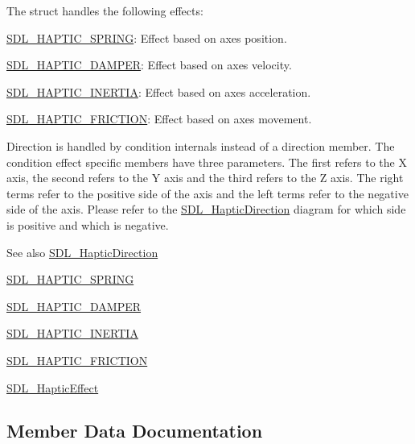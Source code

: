 The struct handles the following effects\+:
\begin{DoxyItemize}
\item \hyperlink{SDL__haptic_8h_a3b52d4700380085e2b5d87bb20320fb1}{S\+D\+L\+\_\+\+H\+A\+P\+T\+I\+C\+\_\+\+S\+P\+R\+I\+NG}\+: Effect based on axes position.
\item \hyperlink{SDL__haptic_8h_a69522f261973e3ea4273486141320a87}{S\+D\+L\+\_\+\+H\+A\+P\+T\+I\+C\+\_\+\+D\+A\+M\+P\+ER}\+: Effect based on axes velocity.
\item \hyperlink{SDL__haptic_8h_a14b807471589120395aec28293cf6642}{S\+D\+L\+\_\+\+H\+A\+P\+T\+I\+C\+\_\+\+I\+N\+E\+R\+T\+IA}\+: Effect based on axes acceleration.
\item \hyperlink{SDL__haptic_8h_a98a5011311168d63921aaac21403a4d8}{S\+D\+L\+\_\+\+H\+A\+P\+T\+I\+C\+\_\+\+F\+R\+I\+C\+T\+I\+ON}\+: Effect based on axes movement.
\end{DoxyItemize}

Direction is handled by condition internals instead of a direction member. The condition effect specific members have three parameters. The first refers to the X axis, the second refers to the Y axis and the third refers to the Z axis. The right terms refer to the positive side of the axis and the left terms refer to the negative side of the axis. Please refer to the \hyperlink{structSDL__HapticDirection}{S\+D\+L\+\_\+\+Haptic\+Direction} diagram for which side is positive and which is negative.

\begin{DoxySeeAlso}{See also}
\hyperlink{structSDL__HapticDirection}{S\+D\+L\+\_\+\+Haptic\+Direction} 

\hyperlink{SDL__haptic_8h_a3b52d4700380085e2b5d87bb20320fb1}{S\+D\+L\+\_\+\+H\+A\+P\+T\+I\+C\+\_\+\+S\+P\+R\+I\+NG} 

\hyperlink{SDL__haptic_8h_a69522f261973e3ea4273486141320a87}{S\+D\+L\+\_\+\+H\+A\+P\+T\+I\+C\+\_\+\+D\+A\+M\+P\+ER} 

\hyperlink{SDL__haptic_8h_a14b807471589120395aec28293cf6642}{S\+D\+L\+\_\+\+H\+A\+P\+T\+I\+C\+\_\+\+I\+N\+E\+R\+T\+IA} 

\hyperlink{SDL__haptic_8h_a98a5011311168d63921aaac21403a4d8}{S\+D\+L\+\_\+\+H\+A\+P\+T\+I\+C\+\_\+\+F\+R\+I\+C\+T\+I\+ON} 

\hyperlink{unionSDL__HapticEffect}{S\+D\+L\+\_\+\+Haptic\+Effect} 
\end{DoxySeeAlso}


\subsection{Member Data Documentation}
\mbox{\label{structSDL__HapticCondition_acd35a9d432ad122bf7824b16974eac7a}} 
